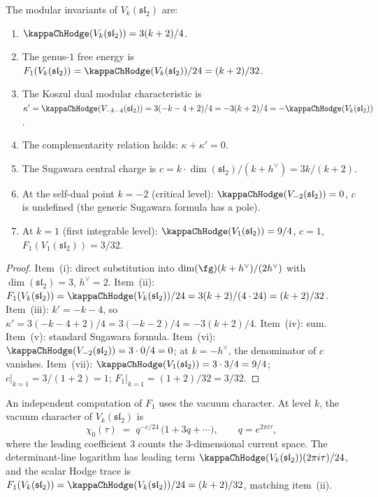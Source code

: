 \begin{proposition}
\label{prop:benchmark-modular-data}
The modular invariants of $V_k(\mathfrak{sl}_2)$ are:
\begin{enumerate}[label=\textup{(\roman*)},nosep]
\item $\kappaChHodge(V_k(\mathfrak{sl}_2)) = 3(k+2)/4$.
\item The genus-$1$ free energy is
 \(F_1(V_k(\mathfrak{sl}_2))
 =\kappaChHodge(V_k(\mathfrak{sl}_2))/24 = (k+2)/32\).
\item The Koszul dual modular characteristic is
 $\kappa' = \kappaChHodge(V_{-k-4}(\mathfrak{sl}_2))
 = 3(-k - 4 + 2)/4
 = -3(k+2)/4 = -\kappaChHodge(V_k(\mathfrak{sl}_2))$.
\item The complementarity relation holds:
 $\kappa + \kappa' = 0$.
\item The Sugawara central charge is
 $c = k \cdot \dim(\mathfrak{sl}_2)/(k + h^\vee)
 = 3k/(k+2)$.
\item At the self-dual point $k = -2$
 \textup{(}critical level\textup{)}:
$\kappaChHodge(V_{-2}(\mathfrak{sl}_2)) = 0$, $c$ is undefined
 \textup{(}the generic Sugawara formula has a pole\textup{)}.
\item At $k = 1$ \textup{(}first integrable level\textup{)}:
 $\kappaChHodge(V_1(\mathfrak{sl}_2)) = 9/4$, $c = 1$,
 \(F_1(V_1(\mathfrak{sl}_2))=3/32\).
\end{enumerate}
\end{proposition}

\begin{proof}
Item~(i): direct substitution into
$\dim(\fg)(k+h^\vee)/(2h^\vee)$ with
$\dim(\mathfrak{sl}_2) = 3$, $h^\vee = 2$.
Item~(ii): \(F_1(V_k(\mathfrak{sl}_2))
=\kappaChHodge(V_k(\mathfrak{sl}_2))/24
=3(k+2)/(4 \cdot 24) = (k+2)/32\).
Item~(iii): $k' = -k-4$, so $\kappa' = 3(-k-4+2)/4 = 3(-k-2)/4
= -3(k+2)/4$.
Item~(iv): sum.
Item~(v): standard Sugawara formula.
Item~(vi): $\kappaChHodge(V_{-2}(\mathfrak{sl}_2)) = 3 \cdot 0/4 = 0$;
at $k = -h^\vee$, the denominator of $c$ vanishes.
Item~(vii): $\kappaChHodge(V_1(\mathfrak{sl}_2)) = 3 \cdot 3/4 = 9/4$;
$c|_{k=1} = 3/(1+2) = 1$;
$F_1|_{k=1} = (1+2)/32 = 3/32$.
\end{proof}

\begin{remark}
\label{rem:benchmark-f1-character}
An independent computation of $F_1$ uses the vacuum character.
At level $k$, the vacuum character of $V_k(\mathfrak{sl}_2)$ is
\[
 \chi_0(\tau)
 \;=\;
 q^{-c/24}\,\bigl(1 + 3q + \cdots\bigr),
 \qquad q = e^{2\pi i \tau},
\]
where the leading coefficient $3$ counts the $3$-dimensional
current space. The determinant-line logarithm has leading term
$\kappaChHodge(V_k(\mathfrak{sl}_2))(2\pi i\tau)/24$,
and the scalar Hodge trace is
\(F_1(V_k(\mathfrak{sl}_2))
=\kappaChHodge(V_k(\mathfrak{sl}_2))/24=(k+2)/32\),
matching item~(ii).
\end{remark}


